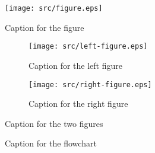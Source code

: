 

%
%

\newpage


\vfill

\begin{figure}[h!]
    \centering
    \texttt{[image: src/figure.eps]}
    \caption{Caption for the figure}
    \label{fig:figure}
\end{figure}

\vfill


\begin{figure}[h!]
    \centering
    \begin{subfigure}[b]{0.45\textwidth}
        \texttt{[image: src/left-figure.eps]}
        \caption{Caption for the left figure}\label{fig:left-figure}
    \end{subfigure}
    \hfill
    \begin{subfigure}[b]{0.45\textwidth}
        \texttt{[image: src/right-figure.eps]}
        \caption{Caption for the right figure}\label{fig:right-figure}
    \end{subfigure}

    \caption{Caption for the two figures}
    \label{fig:two-figures}
\end{figure}

\vfill


\begin{figure}[h!]
    \centering
    
    \caption{Caption for the flowchart}
    \label{fig:flowchart}
\end{figure}

\vfill
